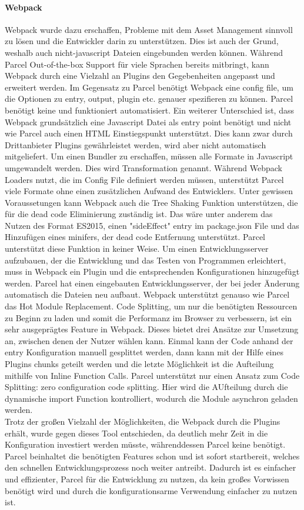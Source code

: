 \paragraph{Webpack} Webpack wurde dazu erschaffen, Probleme mit dem Asset Management sinnvoll zu lösen und die Entwickler darin zu unterstützen. Dies ist auch der Grund, weshalb auch nicht-javascript Dateien eingebunden werden können. Während Parcel Out-of-the-box Support für viele Sprachen bereits mitbringt, kann Webpack durch eine Vielzahl an Plugins den Gegebenheiten angepasst und erweitert werden. Im Gegensatz zu Parcel benötigt Webpack eine config file, um die Optionen zu entry, output, plugin etc. genauer spezifieren zu können. Parcel benötigt keine und funktioniert automatisiert. Ein weiterer Unterschied ist, dass Webpack grundsätzlich eine Javascript Datei als entry point benötigt und nicht wie Parcel auch einen HTML Einstiegspunkt unterstützt. Dies kann zwar durch Drittanbieter Plugins gewährleistet werden, wird aber nicht automatisch mitgeliefert. Um einen Bundler zu erschaffen, müssen alle Formate in Javascript umgewandelt werden. Dies wird Transformation genannt. Während Webpack Loaders nutzt, die im Config File definiert werden müssen, unterstützt Parcel viele Formate ohne einen zusätzlichen Aufwand des Entwicklers. Unter gewissen Voraussetungen kann Webpack auch die Tree Shaking Funktion unterstützen, die für die dead code Eliminierung zuständig ist. Das wäre unter anderem das Nutzen des Format  ES2015, einen "sideEffect" entry im package.json File und das Hinzufügen eines minifers, der dead code Entfernung unterstützt. Parcel unterstützt diese Funktion in keiner Weise. Um einen Entwicklungsserver aufzubauen, der die Entwicklung und das Testen von Programmen erleichtert, muss in Webpack ein Plugin und die entsprechenden Konfigurationen hinzugefügt werden. Parcel hat einen eingebauten Entwicklungsserver, der bei jeder Änderung automatisch die Dateien neu aufbaut. Webpack unterstützt genauso wie Parcel das Hot Module Replacement. Code Splitting, um nur die benötigten Ressourcen zu Beginn zu laden und somit die Performanz im Browser zu verbessern, ist ein sehr ausgeprägtes Feature in Webpack. Dieses bietet drei Ansätze zur Umsetzung an, zwischen denen der Nutzer wählen kann. Einmal kann der Code anhand der entry Konfiguration manuell gesplittet werden, dann kann mit der Hilfe eines Plugins chunks geteilt werden und die letzte Möglichkeit ist die Aufteilung mithilfe von Inline Function Calls. Parcel unterstützt nur einen Ansatz zum Code Splitting: zero configuration code splitting. Hier wird die AUfteilung durch die dynamische import Function kontrolliert, wodurch die Module asynchron geladen werden.
\\
Trotz der großen Vielzahl der Möglichkeiten, die Webpack durch die Plugins erhält, wurde gegen dieses Tool entschieden, da deutlich mehr Zeit in die Konfiguration investiert werden müsste, währenddessen Parcel keine benötigt. Parcel beinhaltet die benötigten Features schon und ist sofort startbereit, welches den schnellen Entwicklungsprozess noch weiter antreibt. Dadurch ist es einfacher und effizienter, Parcel für die Entwicklung zu nutzen, da kein großes Vorwissen benötigt wird und durch die konfigurationsarme Verwendung einfacher zu nutzen ist.


